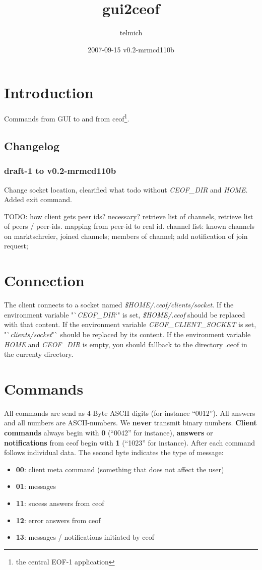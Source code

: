 \documentclass[12pt,a4paper]{article}
\begin{document}
\title{gui2ceof}
\date{2007-09-15 v0.2-mrmcd110b}
\author{telmich}

\maketitle
\tableofcontents

\section{Introduction}
Commands from GUI to and from
ceof\footnote{the central EOF-1 application}.

\subsection{Changelog}
\subsubsection{draft-1 to v0.2-mrmcd110b}
Change socket location, clearified what todo without
\textit{CEOF\_DIR} and \textit{HOME}. Added exit command.

TODO: how client gets peer ids? necessary? retrieve list of channels, retrieve
list of peers / peer-ids.  mapping from peer-id to real id. channel list: known
channels on marktschreier, joined channels; members of channel; add notification
of join request;

\section{Connection}
The client connects to a socket named \textit{\$HOME/.ceof/clients/socket}.
If the environment variable "`\textit{CEOF\_DIR}`" is set,
\textit{\$HOME/.ceof} should be replaced with that content.
If the environment variable \textit{CEOF\_CLIENT\_SOCKET} is set,
"`\textit{clients/socket}"` should be replaced by its content.
If the environment variable \textit{HOME} and \textit{CEOF\_DIR}
is empty, you should fallback to the directory .ceof in the currenty directory.

\section{Commands}
All commands are send as 4-Byte ASCII digits (for instance "`0012"').
All answers and all numbers are ASCII-numbers. We
\textbf{never} transmit binary numbers.
\textbf{Client commands} always begin with \textbf{0} ("`0042"' for instance),
\textbf{answers} or \textbf{notifications} from
ceof begin with \textbf{1} ("`1023"' for instance).
After each command follows individual data. The second byte indicates the type of message:
\begin{itemize}
\item \textbf{00}: client meta command (something that does not affect the user)
\item \textbf{01}: messages
\item \textbf{11}: sucess answers from ceof
\item \textbf{12}: error answers from ceof
\item \textbf{13}: messages / notifications initiated by ceof
\end{itemize}
\end{document}
